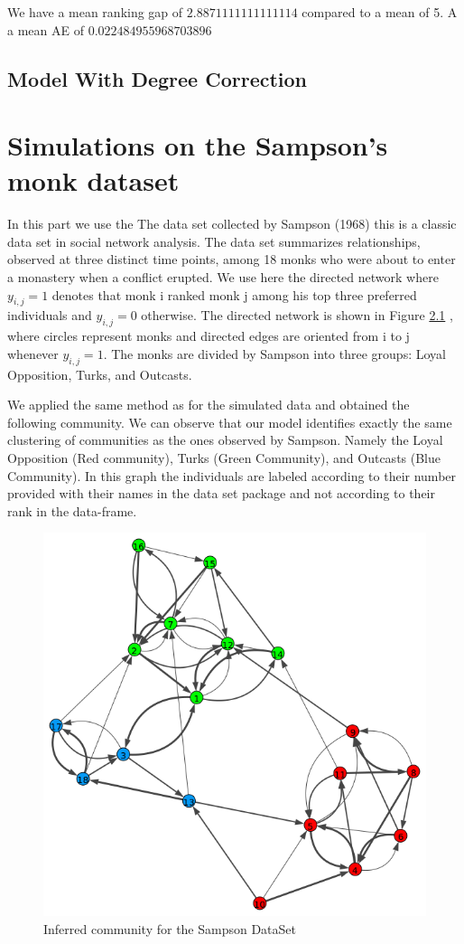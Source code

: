 \documentclass[12pt]{ociamthesis}  %
\begin{document}
	We have a mean ranking gap of $2.8871111111111114$ compared to a mean of 5. A a mean AE of $0.022484955968703896$
	
	
	\section{Model With Degree Correction}
	
	
	
	
	
	\chapter{Simulations on the Sampson’s monk dataset}
	In this part we use the The data set collected by Sampson (1968) this is a classic data set in social network analysis. The data set summarizes relationships, observed at three distinct time points, among 18 monks who were about to enter a monastery when a conflict erupted. We use here the directed network where $y_{i,j} = 1$ denotes that monk i ranked monk j among his top three preferred individuals and $y_{i,j} = 0$ otherwise. The directed network is shown in Figure \ref{label-image4} , where circles represent monks and directed edges are oriented from i to j whenever $y_{i,j} = 1$. The monks are divided by Sampson into three groups: Loyal Opposition, Turks, and Outcasts.
	
	We applied the same method as for the simulated data and obtained the following community. We can observe that our model identifies exactly the same clustering of communities as the ones observed by Sampson. Namely the Loyal Opposition (Red community), Turks (Green Community), and Outcasts (Blue Community). In this graph the individuals are labeled according to their number provided with their names in the data set package and not according to their rank in the data-frame.
	
	
	\begin{figure}
		\centering
		\includegraphics[width=\textwidth,height=\textheight,keepaspectratio]{OptimizationPlotSam}
		\caption{Inferred community for the Sampson DataSet}
		\label{label-image4}
	\end{figure}
	
	
	
\end{document}

